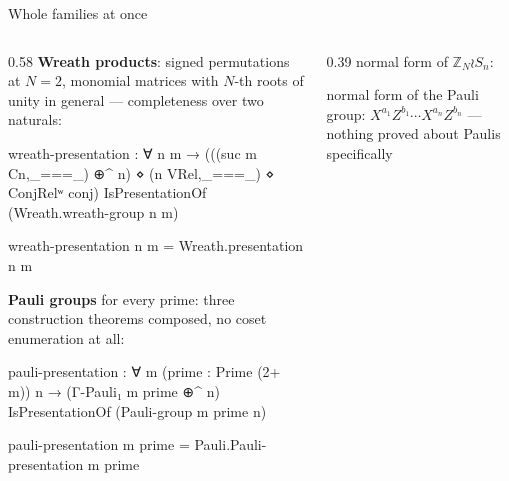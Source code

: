 \begin{frame}{Whole families at once}
\renewcommand{\AgdaCodeStyle}{\footnotesize}
\begin{columns}[c]
\begin{column}{0.58\textwidth}
\textbf{Wreath products}: signed permutations at $N=2$, monomial matrices with
$N$-th roots of unity in general --- completeness over \alert{two naturals}:
\begin{code}
wreath-presentation : ∀ n m →
  (((suc m Cn,_===_) ⊕^ n) ⋄ (n VRel,_===_) ⋄ ConjRelʷ conj)
    IsPresentationOf (Wreath.wreath-group n m)
\end{code}
\begin{code}[hide]
wreath-presentation n m = Wreath.presentation n m
\end{code}
\vspace{4pt}
\textbf{Pauli groups} for every prime: three construction theorems composed,
\alert{no coset enumeration at all}:
\begin{code}
pauli-presentation : ∀ m (prime : Prime (2+ m)) n →
  (Γ-Pauli₁ m prime ⊕^ n) IsPresentationOf (Pauli-group m prime n)
\end{code}
\begin{code}[hide]
pauli-presentation m prime = Pauli.Pauli-presentation m prime
\end{code}
\end{column}
\begin{column}{0.39\textwidth}
\centering
{\small normal form of $\mathbb{Z}_N\wr S_n$:}\\[4pt]

\vspace{10pt}
{\small normal form of the Pauli group: $X^{a_1}Z^{b_1}\cdots X^{a_n}Z^{b_n}$ ---
nothing proved about Paulis specifically}
\end{column}
\end{columns}
\end{frame}

